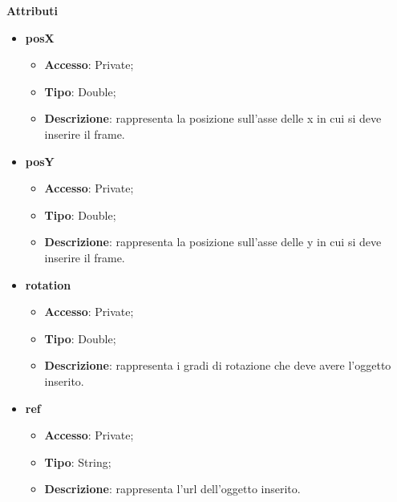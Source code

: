 {{{	\textbf{Attributi}
	\begin{itemize}
		\item \textbf{posX}
		\begin{itemize}
			\item \textbf{Accesso}: Private;
			\item \textbf{Tipo}: Double;
			\item \textbf{Descrizione}: rappresenta la posizione sull’asse delle x in cui si deve inserire il frame.
		\end{itemize}
		\item \textbf{posY}
		\begin{itemize}
			\item \textbf{Accesso}: Private;
			\item \textbf{Tipo}: Double;
			\item \textbf{Descrizione}: rappresenta la posizione sull’asse delle y in cui si deve inserire il frame.
		\end{itemize}
		\item \textbf{rotation}
		\begin{itemize}
			\item \textbf{Accesso}: Private;
			\item \textbf{Tipo}: Double;
			\item \textbf{Descrizione}: rappresenta i gradi di rotazione che deve avere l’oggetto inserito.
		\end{itemize}
		\item \textbf{ref}
		\begin{itemize}
			\item \textbf{Accesso}: Private;
			\item \textbf{Tipo}: String;
			\item \textbf{Descrizione}: rappresenta l’url dell’oggetto inserito.
		\end{itemize}
	\end{itemize}
	
}}}
